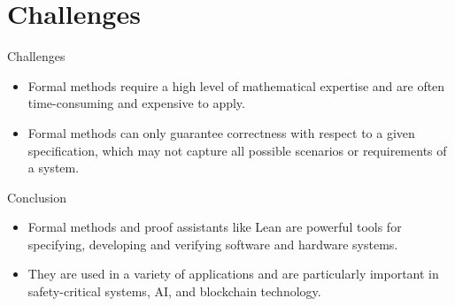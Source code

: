 \documentclass{beamer}
\begin{document}
\section{Challenges}

\begin{frame}{Challenges}
\begin{itemize}
\item Formal methods require a high level of mathematical expertise and are often time-consuming and expensive to apply.
\item Formal methods can only guarantee correctness with respect to a given specification, which may not capture all possible scenarios or requirements of a system.
\end{itemize}
\end{frame}

\begin{frame}{Conclusion}
\begin{itemize}
\item Formal methods and proof assistants like Lean are powerful tools for specifying, developing and verifying software and hardware systems.
\item They are used in a variety of applications and are particularly important in safety-critical systems, AI, and blockchain technology.
\end{itemize}
\end{frame}
\end{document}
